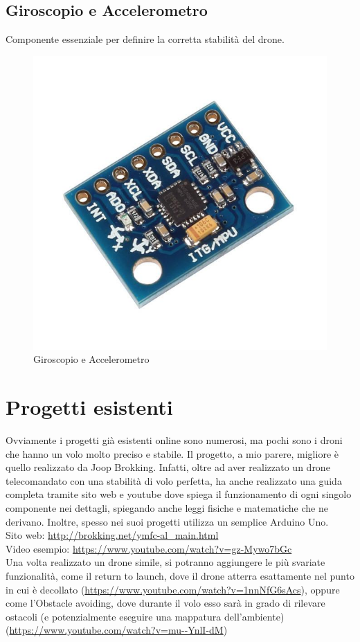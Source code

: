 \documentclass[]{article}
\begin{document}
\subsection{Giroscopio e Accelerometro} 
Componente essenziale per definire la corretta stabilità del drone.
\begin{figure}[!htpb]
\centering
\includegraphics[scale=0.2]{figura6.jpg}
\caption{Giroscopio e Accelerometro}
\label{figura6}
\end{figure}
\section{Progetti esistenti}
Ovviamente i progetti già esistenti online sono numerosi, ma pochi sono i droni che hanno un volo molto preciso e stabile. Il progetto, a mio parere, migliore è quello realizzato da Joop Brokking. Infatti, oltre ad aver realizzato un drone telecomandato con una stabilità di volo perfetta, ha anche realizzato una guida completa tramite sito web e youtube dove spiega il funzionamento di ogni singolo componente nei dettagli, spiegando anche leggi fisiche e matematiche che ne derivano. Inoltre, spesso nei suoi progetti utilizza un semplice Arduino Uno.\\Sito web: \url{http://brokking.net/ymfc-al_main.html}\\Video esempio: \url{https://www.youtube.com/watch?v=gz-Mywo7bGc}\\
Una volta realizzato un drone simile, si potranno aggiungere le più svariate funzionalità, come il return to launch, dove il drone atterra esattamente nel punto in cui è decollato (\url{https://www.youtube.com/watch?v=1nnNfG6sAcs}), oppure come l'Obstacle avoiding, dove durante il volo esso sarà in grado di rilevare ostacoli (e potenzialmente eseguire una mappatura dell'ambiente)(\url{https://www.youtube.com/watch?v=mu--YnlI-dM}) 
\end{document}
